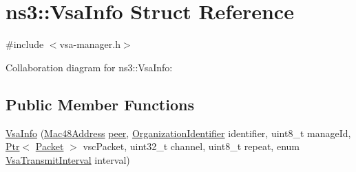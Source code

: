 \hypertarget{structns3_1_1VsaInfo}{}\section{ns3\+:\+:Vsa\+Info Struct Reference}
\label{structns3_1_1VsaInfo}


{\ttfamily \#include $<$vsa-\/manager.\+h$>$}



Collaboration diagram for ns3\+:\+:Vsa\+Info\+:
\subsection*{Public Member Functions}
\begin{DoxyCompactItemize}
\item 
\hyperlink{structns3_1_1VsaInfo_ae07389ace48a42335841cbb73ba46aa0}{Vsa\+Info} (\hyperlink{classns3_1_1Mac48Address}{Mac48\+Address} \hyperlink{structns3_1_1VsaInfo_a9aabfb3896a3bff488a870c6ed42bc39}{peer}, \hyperlink{classns3_1_1OrganizationIdentifier}{Organization\+Identifier} identifier, uint8\+\_\+t manage\+Id, \hyperlink{classns3_1_1Ptr}{Ptr}$<$ \hyperlink{classns3_1_1Packet}{Packet} $>$ vsc\+Packet, uint32\+\_\+t channel, uint8\+\_\+t repeat, enum \hyperlink{namespacens3_a417ab130a77d452a8b5014090665bcc1}{Vsa\+Transmit\+Interval} interval)
\end{DoxyCompactItemize}

